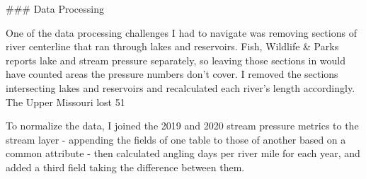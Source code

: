 \documentclass[11pt]{article}
\begin{document}
### Data Processing

One of the data processing challenges I had to navigate was removing sections of river centerline that ran through lakes and reservoirs. Fish, Wildlife & Parks reports lake and stream pressure separately, so leaving those sections in would have counted areas the pressure numbers don't cover. I removed the sections intersecting lakes and reservoirs and recalculated each river's length accordingly. The Upper Missouri lost 51%

To normalize the data, I joined the 2019 and 2020 stream pressure metrics to the stream layer - appending the fields of one table to those of another based on a common attribute - then calculated angling days per river mile for each year, and added a third field taking the difference between them.
\end{document}

